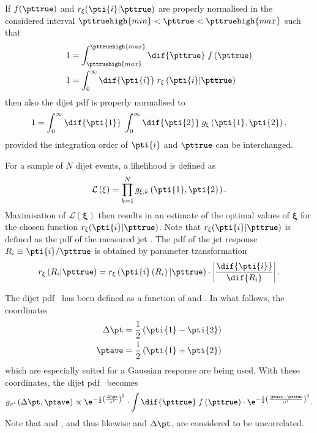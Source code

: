 If $f(\pttrue)$ and $r_{\mathbf{\xi}}(\pti{i}|\pttrue)$ are properly normalised in the considered interval \mbox{$\pttruehigh{min} < \pttrue < \pttruehigh{max}$} such that
\begin{align}
  \begin{split}
    1 & = \int^{\pttruehigh{max}}_{\pttruehigh{max}}\dif{\pttrue}\;f\left(\pttrue\right) \\
    1 & = \int^{\infty}_{0}\dif{\pti{i}}\;r_{\mathbf{\xi}}\left(\pti{i}|\pttrue\right)
  \end{split}
\end{align}
then also the dijet pdf is properly normalised to
\begin{equation*}
  1 = \int^{\infty}_{0}\dif{\pti{1}}\;\int^{\infty}_{0}\dif{\pti{2}}\; g_{\mathbf{\xi}}\left(\pti{1},\pti{2}\right),
\end{equation*}
provided the integration order of $\pti{i}$ and $\pttrue$ can be interchanged.

For a sample of $N$ dijet events, a likelihood is defined as
\begin{equation}
  \label{eq:ResFit:Likelihood}
  \mathcal{L}\left(\mathbf{\xi}\right) = \prod^{N}_{k=1} g_{\mathbf{\xi},k}\left(\pti{1},\pti{2}\right).
\end{equation}
Maximisation of $\mathcal{L}(\mathbf{\xi})$ then results in an
estimate of the optimal values of $\mathbf{\xi}$ for the chosen
function $r_{\mathbf{\xi}}(\pti{i}|\pttrue)$.
Note that $r_{\mathbf{\xi}}(\pti{i}|\pttrue)$ is defined as the
pdf of the measured jet \pt.
The pdf of the jet \pt response \mbox{$R_{i}\equiv\pti{i} / \pttrue$} is obtained by parameter transformation
\begin{equation*}
  r_{\mathbf{\xi}}\left(R_{i}|\pttrue\right) =
  r_{\mathbf{\xi}}\left(\pti{i}\left(R_{i}\right)|\pttrue\right)\cdot\left|\frac{\dif{\pti{i}}}{\dif{R_{i}}}\right|.
\end{equation*}


The dijet pdf~ has been defined as a function
of  and .
In what follows, the coordinates
\begin{align}
  \label{eq:ResFit:TransformedCoordinates}
  \begin{split}
    \Delta\pt  &  = \frac{1}{2}\left(\pti{1}-\pti{2}\right) \\
    \ptave     &  = \frac{1}{2}\left(\pti{1}+\pti{2}\right)
  \end{split}
\end{align} 
which are especially suited for a Gaussian response are being used.
With these coordinates, the dijet pdf~ becomes
\begin{equation}
  \label{eq:ResFit:DijetPdfTransformed}
   g_{\sigma'}\left(\Delta\pt,\ptave\right) \propto
   \e^{-\frac{1}{2}\left(\frac{\Delta\pt}{\sigma'}\right)^{2}}\cdot
   \int\dif{\pttrue}\;f\left(\pttrue\right)\cdot
   \e^{-\frac{1}{2}\left(\frac{\ptave - \pttrue}{\sigma'}\right)^{2}}.
\end{equation}
Note that  and , and thus likewise \ptave and $\Delta\pt$, are considered to be uncorrelated.


